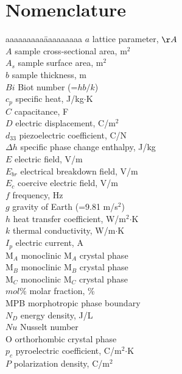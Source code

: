 \chapter*{Nomenclature}

\begin{tabbing}
aaaaaaaaa\= aaaaaaaaa\kill
$a$ \>        lattice parameter, $\AA$\\
$A$ \>        sample cross-sectional area, m$^2$\\
$A_s$ \>        sample surface area, m$^2$\\
$b$ \>        sample thickness, m \\
$Bi$ \>       Biot number (=$hb/k$) \\
$c_p$ \>      specific heat, J/kg$\cdot$K\\
$C$ \>        capacitance, F \\
$D$ \>        electric displacement, C/m$^2$\\
$d_{33}$ \>   piezoelectric coefficient, C/N\\
$\Delta h$ \>  specific phase change enthalpy, J/kg\\
$E$ \>        electric field, V/m\\
$E_{br}$ \>    electrical breakdown field, V/m\\
$E_{c}$ \>    coercive electric field, V/m\\
$f$ \>        frequency, Hz\\
$g$ \>          gravity of Earth (=9.81 m/s$^2$) \\
$h$    \>     heat transfer coefficient, W/m$^{2}$$\cdot$K \\
$k$ \>        thermal conductivity, W/m$\cdot$K\\
$I_p$ \>      electric current, A\\
M$_A$ \>       monoclinic M$_A$ crystal phase \\
M$_B$ \>       monoclinic M$_B$ crystal phase \\
M$_C$ \>       monoclinic M$_C$ crystal phase \\
$mol\%$\>    molar fraction, \% \\
MPB \>         morphotropic phase boundary \\
$N_D$ \>      energy density, J/L\\
$Nu$ \>     Nusselt number \\
O \>       orthorhombic crystal phase \\
$p_c$ \>      pyroelectric coefficient, C/m$^2$$\cdot$K\\
$P$ \>        polarization density, C/m$^2$\\

\end{tabbing}
